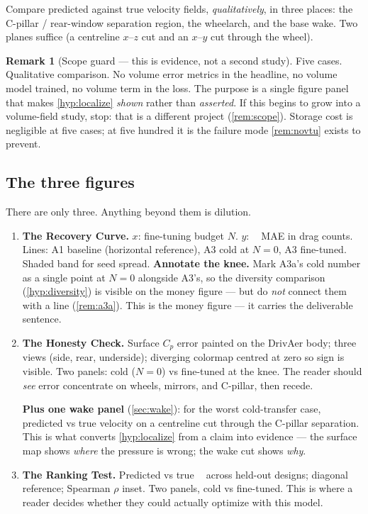 \documentclass[10pt,a4paper]{article}
\theoremstyle{definition}
\newtheorem{remark}{Remark}[section]
\DeclareMathOperator{\Cd}{C_d}
\newcommand{\Cp}{{C_p}}
\begin{document}
Compare predicted against true velocity fields, \emph{qualitatively}, in three places:
the C-pillar / rear-window separation region, the wheelarch, and the base wake. Two
planes suffice (a centreline $x$--$z$ cut and an $x$--$y$ cut through the wheel).

\begin{remark}[Scope guard --- this is evidence, not a second study]
Five cases. Qualitative comparison. No volume error metrics in the headline, no volume
model trained, no volume term in the loss. The purpose is a single figure panel that
makes \cref{hyp:localize} \emph{shown} rather than \emph{asserted}. If this begins to
grow into a volume-field study, stop: that is a different project
(\cref{rem:scope}). Storage cost is negligible at five cases; at five hundred it is the
failure mode \cref{rem:novtu} exists to prevent.
\end{remark}

\subsection{The three figures}

There are only three. Anything beyond them is dilution.

\begin{enumerate}[label=F\arabic*.]
  \item \textbf{The Recovery Curve.} $x$: fine-tuning budget $N$. $y$: $\Cd$ MAE in
  drag counts. Lines: A1 baseline (horizontal reference), A3 cold at $N{=}0$, A3
  fine-tuned. Shaded band for seed spread. \textbf{Annotate the knee.} Mark A3a's cold
  number as a single point at $N{=}0$ alongside A3's, so the diversity comparison
  (\cref{hyp:diversity}) is visible on the money figure --- but do \emph{not} connect
  them with a line (\cref{rem:a3a}). This is the money figure --- it carries the
  deliverable sentence.

  \item \textbf{The Honesty Check.} Surface $\Cp$ error painted on the DrivAer body;
  three views (side, rear, underside); diverging colormap centred at zero so sign is
  visible. Two panels: cold ($N{=}0$) vs fine-tuned at the knee. The reader should
  \emph{see} error concentrate on wheels, mirrors, and C-pillar, then recede.

  \textbf{Plus one wake panel} (\cref{sec:wake}): for the worst cold-transfer case,
  predicted vs true velocity on a centreline cut through the C-pillar separation. This
  is what converts \cref{hyp:localize} from a claim into evidence --- the surface map
  shows \emph{where} the pressure is wrong; the wake cut shows \emph{why}.

  \item \textbf{The Ranking Test.} Predicted vs true $\Cd$ across held-out designs;
  diagonal reference; Spearman $\rho$ inset. Two panels, cold vs fine-tuned. This is
  where a reader decides whether they could actually optimize with this model.
\end{enumerate}
\end{document}
